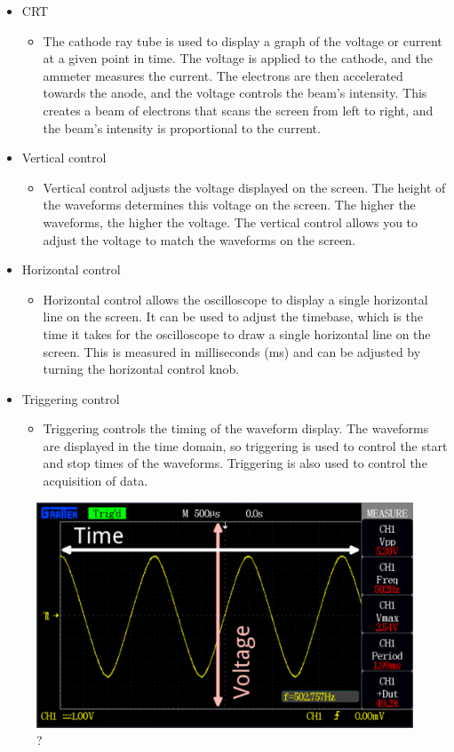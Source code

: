 \begin{itemize}
	\item CRT
	\begin{itemize}
		\item The cathode ray tube is used to display a graph of the voltage or current at a given point in time. The voltage is applied to the cathode, and the ammeter measures the current. The electrons are then accelerated towards the anode, and the voltage controls the beam’s intensity. This creates a beam of electrons that scans the screen from left to right, and the beam’s intensity is proportional to the current.
	\end{itemize}
	\item Vertical control
	\begin{itemize}
		\item Vertical control adjusts the voltage displayed on the screen. The height of the waveforms determines this voltage on the screen. The higher the waveforms, the higher the voltage. The vertical control allows you to adjust the voltage to match the waveforms on the screen.
	\end{itemize}
	\item Horizontal control
	\begin{itemize}
		\item Horizontal control allows the oscilloscope to display a single horizontal line on the screen. It can be used to adjust the timebase, which is the time it takes for the oscilloscope to draw a single horizontal line on the screen. This is measured in milliseconds (ms) and can be adjusted by turning the horizontal control knob.
	\end{itemize}
	\item Triggering control
	\begin{itemize}
		\item Triggering controls the timing of the waveform display. The waveforms are displayed in the time domain, so triggering is used to control the start and stop times of the waveforms. Triggering is also used to control the acquisition of data.
	\end{itemize}
\end{itemize}

\begin{figure}[H]
	\centering
	\includegraphics[width=12cm]{images/img.png}
	\caption{?}
	\label{fig:dunno}
\end{figure}

